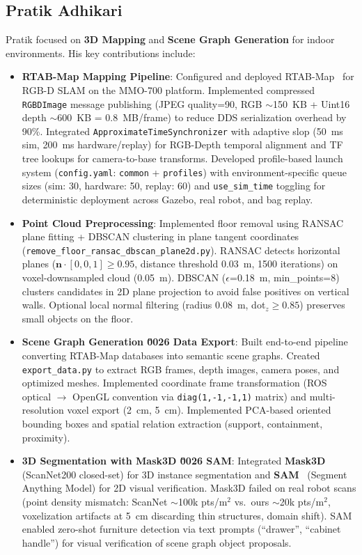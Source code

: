\documentclass[12pt,oneside,a4paper]{article}
\begin{document}
\subsection{Pratik Adhikari}
Pratik focused on \textbf{3D Mapping} and \textbf{Scene Graph Generation} for indoor environments. His key contributions include:
\begin{itemize}
    \item \textbf{RTAB-Map Mapping Pipeline}: Configured and deployed RTAB-Map~\cite{labbe2013rtabmap} for RGB-D SLAM on the MMO-700 platform. Implemented compressed \texttt{RGBDImage} message publishing (JPEG quality=90, RGB $\sim$150~KB + Uint16 depth $\sim$600~KB = 0.8~MB/frame) to reduce DDS serialization overhead by 90\%. Integrated \texttt{ApproximateTimeSynchronizer} with adaptive slop (50~ms sim, 200~ms hardware/replay) for RGB-Depth temporal alignment and TF tree lookups for camera-to-base transforms. Developed profile-based launch system (\texttt{config.yaml}: \texttt{common} + \texttt{profiles}) with environment-specific queue sizes (sim: 30, hardware: 50, replay: 60) and \texttt{use\_sim\_time} toggling for deterministic deployment across Gazebo, real robot, and bag replay.
    
    \item \textbf{Point Cloud Preprocessing}: Implemented floor removal using RANSAC plane fitting + DBSCAN clustering in plane tangent coordinates (\texttt{remove\_floor\_ransac\_dbscan\_plane2d.py}). RANSAC detects horizontal planes ($\mathbf{n} \cdot [0,0,1] \geq 0.95$, distance threshold 0.03~m, 1500 iterations) on voxel-downsampled cloud (0.05~m). DBSCAN ($\epsilon$=0.18~m, min\_points=8) clusters candidates in 2D plane projection to avoid false positives on vertical walls. Optional local normal filtering (radius 0.08~m, dot$_z \geq 0.85$) preserves small objects on the floor.
    
    \item \textbf{Scene Graph Generation \u0026 Data Export}: Built end-to-end pipeline converting RTAB-Map databases into semantic scene graphs. Created \texttt{export\_data.py} to extract RGB frames, depth images, camera poses, and optimized meshes. Implemented coordinate frame transformation (ROS optical $\to$ OpenGL convention via \texttt{diag(1,-1,-1,1)} matrix) and multi-resolution voxel export (2~cm, 5~cm). Implemented PCA-based oriented bounding boxes and spatial relation extraction (support, containment, proximity).
    
    \item \textbf{3D Segmentation with Mask3D \u0026 SAM}: Integrated \textbf{Mask3D}~\cite{schult2023mask3d} (ScanNet200 closed-set) for 3D instance segmentation and \textbf{SAM}~\cite{kirillov2023sam} (Segment Anything Model) for 2D visual verification. Mask3D failed on real robot scans (point density mismatch: ScanNet $\sim$100k pts/m$^2$ vs.\ ours $\sim$20k pts/m$^2$, voxelization artifacts at 5~cm discarding thin structures, domain shift). SAM enabled zero-shot furniture detection via text prompts (``drawer'', ``cabinet handle'') for visual verification of scene graph object proposals.
    

\end{itemize}
\end{document}
